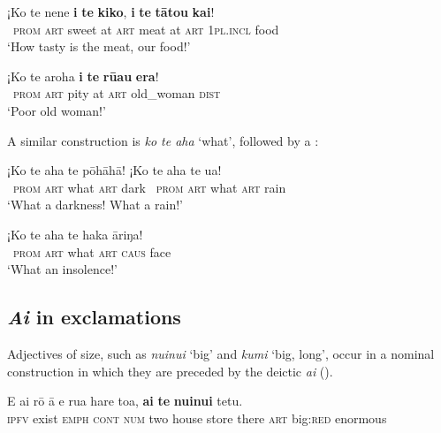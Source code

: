 \ea\label{ex:10.82}
\gll ¡Ko te nene \textbf{i} \textbf{te} \textbf{kiko}, \textbf{i} \textbf{te} \textbf{tātou} \textbf{kai}! \\
~\textsc{prom} \textsc{art} sweet at \textsc{art} meat at \textsc{art} \textsc{1pl.incl} food \\

\glt 
‘How tasty is the meat, our food!’ \textstyleExampleref{[R333.543]} 
\z

\ea\label{ex:10.83}
\gll ¡Ko te {\ꞌ}aroha \textbf{i} \textbf{te} \textbf{rū{\ꞌ}au} \textbf{era}! \\
~\textsc{prom} \textsc{art} pity at \textsc{art} old\_woman \textsc{dist} \\

\glt
‘Poor old woman!’ \textstyleExampleref{[R413.103]} 
\z

A similar construction is \textit{ko te aha} ‘what’, followed by a :

\ea\label{ex:10.84}
\gll ¡Ko te aha te pōhāhā! ¡Ko te aha te {\ꞌ}ua! \\
~\textsc{prom} \textsc{art} what \textsc{art} dark \textsc{~prom} \textsc{art} what \textsc{art} rain \\

\glt 
‘What a darkness! What a rain!’ \textstyleExampleref{[R241.035–036]}
\z

\ea\label{ex:10.85}
\gll ¡Ko te aha te haka {\ꞌ}āriŋa! \\
~\textsc{prom} \textsc{art} what \textsc{art} \textsc{caus} face \\

\glt 
‘What an insolence!’ \textstyleExampleref{[R208.083]} 
\z

\subsection{\textit{{\ꞌ}Ai} in exclamations}\label{sec:10.4.3}

Adjectives of size, such as \textit{nuinui} ‘big’ and \textit{kumi} ‘big, long’, occur in a nominal construction in which they are preceded by the deictic  \textit{{\ꞌ}ai} ().

\ea\label{ex:10.86}
\gll E ai rō {\ꞌ}ā e rua hare toa, \textbf{{\ꞌ}ai} \textbf{te} \textbf{nuinui} tetu. \\
\textsc{ipfv} exist \textsc{emph} \textsc{cont} \textsc{num} two house store there \textsc{art} big:\textsc{red} enormous \\

